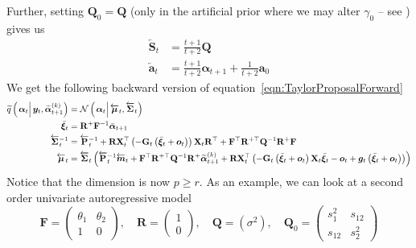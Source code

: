 \documentclass[9pt, notitlepage]{article}
\renewcommand{\vec}[1]{\bm{#1}}
\newcommand{\vecb}[1]{\bar{\vec{#1}}}
\newcommand{\vecLarrow}[1]{\overleftarrow{\vec{#1}}}
\newcommand{\mat}[1]{\mathbf{#1}}
\newcommand{\matLarrow}[1]{\overleftarrow{\mat{#1}}}
\newcommand{\Lparen}[1]{\left( #1\right)}
\newcommand{\Cond}[2]{\left. #1 \vphantom{#2} \right\vert  #2}
\newcommand{\optor}[2]{#1\Lparen{#2}}
\newcommand{\optorC}[3]{\optor{#1}{\Cond{#2}{#3}}}
\newcommand{\normalC}[3]{\optorC{\mathcal{N}}{#1}{#2,#3}}
\newcommand{\IDAproxC}[2]{\optorC{\widetilde{q}}{#1}{#2}}
\newcommand{\particB}[3]{\widetilde{#1}_{#2}^{\Lparen{#3}}}
\newcommand{\dimState}{p}
\newcommand{\dimRng}{r}
\begin{document}
%
Further, setting $\mat{Q}_0 = \mat{Q}$ (only in the artificial prior where we may alter $\gamma_0$ -- see \citet[page 70]{briers10}) gives us %
%
\begin{equation}\begin{split}\label{eqn:FirstOrderStrange}
	\matLarrow{S}_t &= \frac{t +1}{t + 2} \mat{Q} \\
%
	\vecLarrow{a}_t &= %
		\frac{t + 1}{t + 2}\vec{\alpha}_{t+1} +
		\frac{1}{ t+ 2} \vec{a}_0
\end{split}\end{equation}
%
We get the following backward version of equation~\eqref{eqn:TaylorProposalForward}%
%
{\scriptsize%
\begin{equation}\begin{split}\label{eqn:bw_approx}
	\IDAproxC{\vec{\alpha}_t}{\vec{y}_t, \particB{\vec{\alpha}}{t + 1}{k}} &=   %
		\normalC{\vec{\alpha}_t}{\vecLarrow{\mu}_t}{\matLarrow{\Sigma}_t} \\
%
	\vecb{\xi}_{t} &= \mat{R}^{+}\mat{F}^{-1}\vecb{\alpha}_{t + 1} \\
%
	\matLarrow{\Sigma}_t^{-1} &=
		\matLarrow{P}_t^{-1} +
		\mat{R}\mat{X}_t^\top\Lparen{-\mat{G}_t\Lparen{
		    \vecb{\xi}_{t} + \vec{o}_t}}
		\mat{X}_t\mat{R}^\top + 
		\mat{F}^\top\mat{R}^{+\top}\mat{Q}^{-1}
		\mat{R}^{+}\mat{F}  \\
%
	\vecLarrow{\mu}_t
	 &= \matLarrow{\Sigma}_t \Lparen{
		\matLarrow{P}_t^{-1}\vecLarrow{m}_t +
		\mat{F}^\top\mat{R}^{+\top}
		\mat{Q}^{-1}\mat{R}^{+}\particB{\vec{\alpha}}{t + 1}{k} +
		\mat{R}\mat{X}_t^\top
		\Lparen{
			-\mat{G}_t\Lparen{\vecb{\xi}_{t} + \vec{o}_t}
			\mat{X}_t\vecb{\xi}_{t} - \vec{o}_t +
			\vec{g}_t\Lparen{\vecb{\xi}_{t} + \vec{o}_t}
		}}
\end{split}\end{equation}
}%
%
Notice that the dimension is now $\dimState \geq \dimRng$. As an example, we can look at a second order univariate autoregressive model %
%
$$
\mat{F} = \begin{pmatrix} 
  \theta_1 & \theta_2 \\
  1        & 0
\end{pmatrix}, \quad 
\mat{R} = \begin{pmatrix} 1  \\ 0 \end{pmatrix}, \quad 
\mat{Q} = \Lparen{\sigma^2}, \quad
\mat{Q}_0 = \begin{pmatrix} s_1^2 & s_{12} \\ s_{12} & s_2^2 \end{pmatrix}
$$
\end{document}
